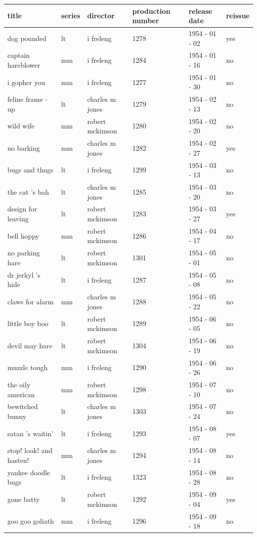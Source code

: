\documentclass{article}
\begin{document}
\begin{tabular}{llllll}
\toprule
title & series & director & production number & release date & reissue \\
\midrule
dog pounded & lt & i freleng & 1278 & 1954 - 01 - 02 & yes \\
captain hareblower & mm & i freleng & 1284 & 1954 - 01 - 16 & no \\
i gopher you & mm & i freleng & 1277 & 1954 - 01 - 30 & no \\
feline frame - up & lt & charles m jones & 1279 & 1954 - 02 - 13 & no \\
wild wife & mm & robert mckimson & 1280 & 1954 - 02 - 20 & no \\
no barking & mm & charles m jones & 1282 & 1954 - 02 - 27 & yes \\
bugs and thugs & lt & i freleng & 1299 & 1954 - 03 - 13 & no \\
the cat 's bah & lt & charles m jones & 1285 & 1954 - 03 - 20 & no \\
design for leaving & lt & robert mckimson & 1283 & 1954 - 03 - 27 & yes \\
bell hoppy & mm & robert mckimson & 1286 & 1954 - 04 - 17 & no \\
no parking hare & lt & robert mckimson & 1301 & 1954 - 05 - 01 & no \\
dr jerkyl 's hide & lt & i freleng & 1287 & 1954 - 05 - 08 & no \\
claws for alarm & mm & charles m jones & 1288 & 1954 - 05 - 22 & no \\
little boy boo & lt & robert mckimson & 1289 & 1954 - 06 - 05 & no \\
devil may hare & lt & robert mckimson & 1304 & 1954 - 06 - 19 & no \\
muzzle tough & mm & i freleng & 1290 & 1954 - 06 - 26 & no \\
the oily american & mm & robert mckimson & 1298 & 1954 - 07 - 10 & no \\
bewitched bunny & lt & charles m jones & 1303 & 1954 - 07 - 24 & no \\
satan 's waitin' & lt & i freleng & 1293 & 1954 - 08 - 07 & yes \\
stop! look! and hasten! & mm & charles m jones & 1294 & 1954 - 08 - 14 & no \\
yankee doodle bugs & lt & i freleng & 1323 & 1954 - 08 - 28 & no \\
gone batty & lt & robert mckimson & 1292 & 1954 - 09 - 04 & yes \\
goo goo goliath & mm & i freleng & 1296 & 1954 - 09 - 18 & no \\

\end{tabular}
\end{document}
